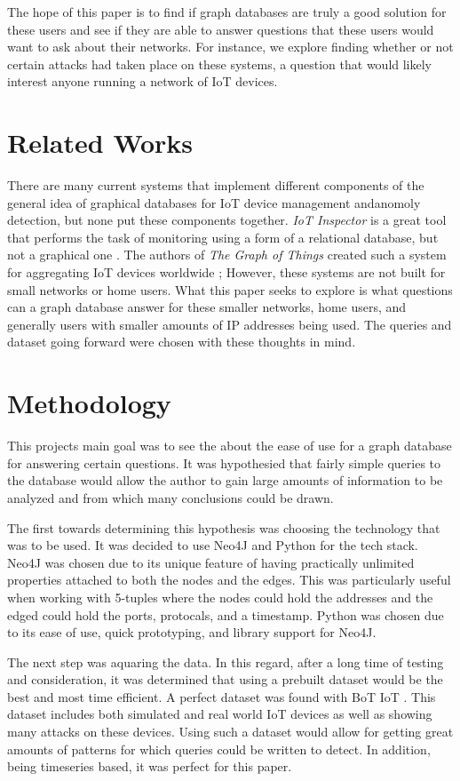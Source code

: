 \documentclass[conference]{IEEEtran}
\begin{document}
The hope of this paper is to find if graph databases are truly a good solution for these users and see
if they are able to answer questions that these users would want to ask about their networks. For instance,
we explore finding whether or not certain attacks had taken place on these systems, a question that would
likely interest anyone running a network of IoT devices.


\section{Related Works}
There are many current systems that implement different components of the general idea of graphical databases for
IoT device management andanomoly detection, but none put these components together. \textit{IoT Inspector} is a great
tool that performs the task of monitoring using a form of a relational database, but not a graphical one \cite{IoTInspector}.
The authors of \textit{The Graph of Things} created such a system for aggregating IoT devices worldwide \cite{GraphofThings}; 
However, these systems are not built for small networks or home users. What this paper seeks to explore is what questions
can a graph database answer for these smaller networks, home users, and generally users with smaller amounts of
IP addresses being used. The queries and dataset going forward were chosen with these thoughts in mind.
 
\section{Methodology}
This projects main goal was to see the about the ease of use for a graph database for answering certain questions.
It was hypothesied that fairly simple queries to the database would allow the author to gain large amounts of
information to be analyzed and from which many conclusions could be drawn.

The first towards determining this hypothesis was choosing the technology that was to be used. It was decided 
to use Neo4J and Python for the tech stack. Neo4J was chosen due to its unique feature of having practically 
unlimited properties attached to both the nodes and the edges. This was particularly useful when working with 
5-tuples where the nodes could hold the addresses and the edged could hold the ports, protocals, and a timestamp.
Python was chosen due to its ease of use, quick prototyping, and library support for Neo4J. 

The next step was aquaring the data. In this regard, after a long time of testing and consideration, it was
determined that using a prebuilt dataset would be the best and most time efficient. A perfect dataset was
found with BoT IoT \cite{BoTIoT}. This dataset includes both simulated and real world IoT devices as well
as showing many attacks on these devices. Using such a dataset would allow for getting great amounts of
patterns for which queries could be written to detect. In addition, being timeseries based, it was perfect
for this paper.
\end{document}
